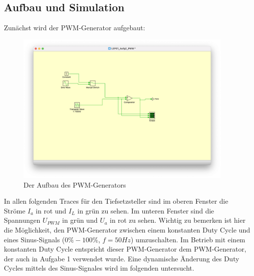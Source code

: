 \documentclass{report}
\begin{document}
\newpage
\subsection{Aufbau und Simulation}

Zunächst wird der PWM-Generator aufgebaut:

\begin{figure}[hbt!]
	\begin{center}
		\includegraphics[width=0.95\textwidth]{assets/img/aufg2_aufbau_pwm.png}
	\end{center}
	\caption{Der Aufbau des PWM-Generators}
	\label{fig:aufg2_aufbau_pwm}
\end{figure}

In allen folgenden Traces für den Tiefsetzsteller sind im oberen Fenster die Ströme $I_a$ in rot und $I_L$ in grün zu sehen. Im unteren Fenster sind die Spannungen $U_{PWM}$ in grün und $U_a$ in rot zu sehen.
Wichtig zu bemerken ist hier die Möglichkeit, den PWM-Generator zwischen einem konstanten Duty Cycle und eines Sinus-Signals ($0\% - 100\%$, $f=50Hz$) umzuschalten. Im Betrieb mit einem konstanten Duty Cycle entspricht dieser PWM-Generator dem PWM-Generator, der auch in Aufgabe 1 verwendet wurde. Eine dynamische Änderung des Duty Cycles mittels des Sinus-Signales wird im folgenden untersucht.
\end{document}
